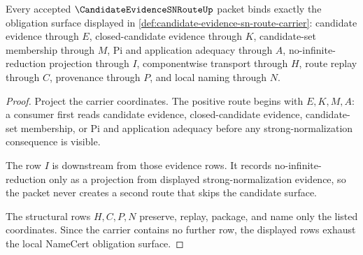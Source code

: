 \begin{theorem}
\label{thm:candidate-evidence-sn-route-obligation-surface}
Every accepted $\CandidateEvidenceSNRouteUp$ packet binds exactly the obligation surface displayed in \autoref{def:candidate-evidence-sn-route-carrier}: candidate evidence through $E$, closed-candidate evidence through $K$, candidate-set membership through $M$, Pi and application adequacy through $A$, no-infinite-reduction projection through $I$, componentwise transport through $H$, route replay through $C$, provenance through $P$, and local naming through $N$.
\end{theorem}
\begin{proof}
Project the carrier coordinates. The positive route begins with $E,K,M,A$: a consumer first reads candidate evidence, closed-candidate evidence, candidate-set membership, or Pi and application adequacy before any strong-normalization consequence is visible.

The row $I$ is downstream from those evidence rows. It records no-infinite-reduction only as a projection from displayed strong-normalization evidence, so the packet never creates a second route that skips the candidate surface.

The structural rows $H,C,P,N$ preserve, replay, package, and name only the listed coordinates. Since the carrier contains no further row, the displayed rows exhaust the local NameCert obligation surface.
\end{proof}

